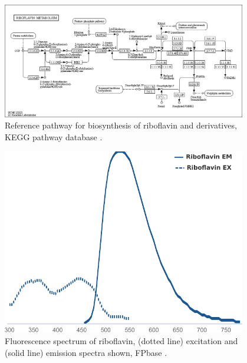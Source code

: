 \begin{figure}
  \centering
  \includegraphics[width=0.95\textwidth]{kegg-flavin}
  \caption[
    Reference pathway for biosynthesis of riboflavin and derivatives
  ]{
    Reference pathway for biosynthesis of riboflavin and derivatives, KEGG pathway database \parencite{kanehisaKEGGTaxonomybasedAnalysis2023}.
    }
  \label{fig:intro-flavin-kegg}
\end{figure}

\begin{figure}
  \centering
  \includegraphics[width=0.95\textwidth]{fpbase-riboflavin-adapted}
  \caption[
    Fluorescence spectrum of riboflavin
  ]{
    Fluorescence spectrum of riboflavin, (dotted line) excitation and (solid line) emission spectra shown, FPbase \parencite{lambertUsingFPbaseFluorescent2023}.
    }
  \label{fig:intro-flavin-spectra}
\end{figure}

